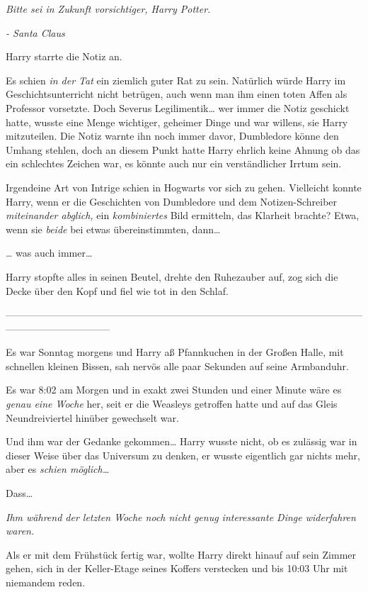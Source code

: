 {\emph{Bitte sei in Zukunft vorsichtiger, Harry Potter.}

\emph{- Santa Claus}

Harry starrte die Notiz an.

Es schien \emph{in der Tat} ein ziemlich guter Rat zu sein. Natürlich würde Harry im Geschichtsunterricht nicht betrügen, auch wenn man ihm einen toten Affen als Professor vorsetzte. Doch Severus Legilimentik… wer immer die Notiz geschickt hatte, wusste eine Menge wichtiger, geheimer Dinge und war willens, sie Harry mitzuteilen. Die Notiz warnte ihn noch immer davor, Dumbledore könne den Umhang stehlen, doch an diesem Punkt hatte Harry ehrlich keine Ahnung ob das ein schlechtes Zeichen war, es könnte auch nur ein verständlicher Irrtum sein.

Irgendeine Art von Intrige schien in Hogwarts vor sich zu gehen. Vielleicht konnte Harry, wenn er die Geschichten von Dumbledore und dem Notizen-Schreiber \emph{miteinander abglich,} ein \emph{kombiniertes} Bild ermitteln, das Klarheit brachte? Etwa, wenn sie \emph{beide} bei etwas übereinstimmten, dann…

… was auch immer…

Harry stopfte alles in seinen Beutel, drehte den Ruhezauber auf, zog sich die Decke über den Kopf und fiel wie tot in den Schlaf.

--------------------------------------------------------------------------------------------------------------------------------------------

Es war Sonntag morgens und Harry aß Pfannkuchen in der Großen Halle, mit schnellen kleinen Bissen, sah nervös alle paar Sekunden auf seine Armbanduhr.

Es war 8:02 am Morgen und in exakt zwei Stunden und einer Minute wäre es \emph{genau eine Woche} her, seit er die Weasleys getroffen hatte und auf das Gleis Neundreiviertel hinüber gewechselt war.

Und ihm war der Gedanke gekommen… Harry wusste nicht, ob es zulässig war in dieser Weise über das Universum zu denken, er wusste eigentlich gar nichts mehr, aber es \emph{schien möglich…}

Dass…

\emph{Ihm während der letzten Woche noch nicht genug interessante Dinge widerfahren waren.}

Als er mit dem Frühstück fertig war, wollte Harry direkt hinauf auf sein Zimmer gehen, sich in der Keller-Etage seines Koffers verstecken und bis 10:03 Uhr mit niemandem reden.

}
